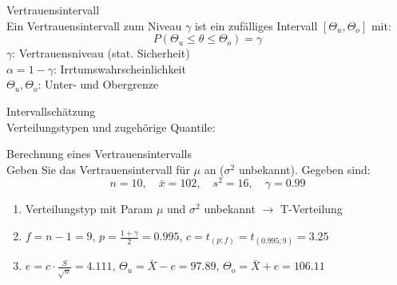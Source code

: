 \begin{definition}{Vertrauensintervall}\\
Ein Vertrauensintervall zum Niveau $\gamma$ ist ein zufälliges Intervall $[\Theta_u,\Theta_o]$ mit:
$$
P(\Theta_u \leq \theta \leq \Theta_o)=\gamma
$$
$\gamma$: Vertrauensniveau (stat. Sicherheit)\\
$\alpha=1-\gamma$: Irrtumswahrscheinlichkeit\\
$\Theta_u, \Theta_o$: Unter- und Obergrenze
\end{definition}

\begin{concept}{Intervallschätzung}\\
Verteilungstypen und zugehörige Quantile:
\begin{center}
\end{center}
\end{concept}

\begin{example}{Berechnung eines Vertrauensintervalls}\\
Geben Sie das Vertrauensintervall für $\mu$ an ($\sigma^2$ unbekannt). Gegeben sind:
$$
n=10, \quad \bar{x}=102, \quad s^2=16, \quad \gamma=0.99
$$

\begin{enumerate}
  \item Verteilungstyp mit Param $\mu$ und $\sigma^2$ unbekannt $\rightarrow$ T-Verteilung
  \item $f=n-1=9$, $p=\frac{1+\gamma}{2}=0.995$, $c=t_{(p;f)}=t_{(0.995;9)}=3.25$
  \item $e=c \cdot \frac{S}{\sqrt{n}}=4.111$, $\Theta_u=\bar{X}-e=97.89$, $\Theta_o=\bar{X}+e=106.11$
\end{enumerate}
\end{example}

